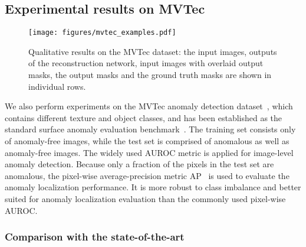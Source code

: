 \documentclass[runningheads]{llncs}
\begin{document}
\subsection{Experimental results on MVTec}


\begin{figure*}
\centering
  \texttt{[image: figures/mvtec\_examples.pdf]}
\caption{Qualitative results on the MVTec dataset: the input images, outputs of the reconstruction network, input images with overlaid output masks, the output masks and the ground truth masks are shown in individual rows.}
\label{fig:mvtec_examples}
\end{figure*}

We also perform experiments on the MVTec anomaly detection dataset~\cite{bergmann2019mvtec}, which contains  different texture and object classes, and has been established as the standard surface anomaly evaluation benchmark~\cite{li2021cutpaste,defard2021padim,zavrtanik2021draem,featspace2}.
The training set consists only of anomaly-free images, while the test set is comprised of anomalous as well as anomaly-free images.
The widely used AUROC metric is applied for image-level anomaly detection. 
Because only a fraction of the pixels in the test set are anomalous, the pixel-wise average-precision metric AP~\cite{zavrtanik2021draem} is used to evaluate the anomaly localization performance. It is more robust to class imbalance and better suited for anomaly localization evaluation than the commonly used pixel-wise AUROC.


\subsubsection{Comparison with the state-of-the-art}
\end{document}
